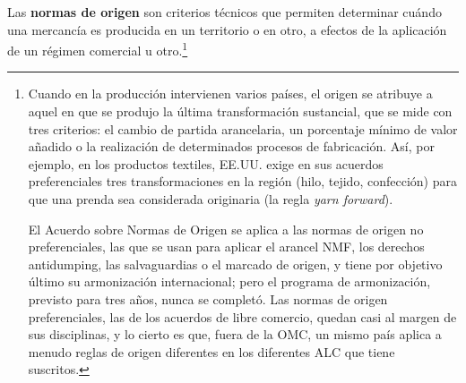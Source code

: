\documentclass[10pt,a4paper]{article}
\begin{document}
Las \textbf{normas de origen} son criterios técnicos que permiten determinar cuándo una mercancía es producida en un territorio o en otro, a efectos de la aplicación de un régimen comercial u otro.\footnote{%
  Cuando en la producción intervienen varios países, el origen se atribuye a aquel en que se produjo la última transformación sustancial, que se mide con tres criterios: el cambio de partida arancelaria, un porcentaje mínimo de valor añadido o la realización de determinados procesos de fabricación. Así, por ejemplo, en los productos textiles, EE.UU. exige en sus acuerdos preferenciales tres transformaciones en la región (hilo, tejido, confección) para que una prenda sea considerada originaria (la regla \textit{yarn forward}).

  El Acuerdo sobre Normas de Origen se aplica a las normas de origen no preferenciales, las que se usan para aplicar el arancel NMF, los derechos antidumping, las salvaguardias o el marcado de origen, y tiene por objetivo último su armonización internacional; pero el programa de armonización, previsto para tres años, nunca se completó. Las normas de origen preferenciales, las de los acuerdos de libre comercio, quedan casi al margen de sus disciplinas, y lo cierto es que, fuera de la OMC, un mismo país aplica a menudo reglas de origen diferentes en los diferentes ALC que tiene suscritos. 
  
}
\end{document}
